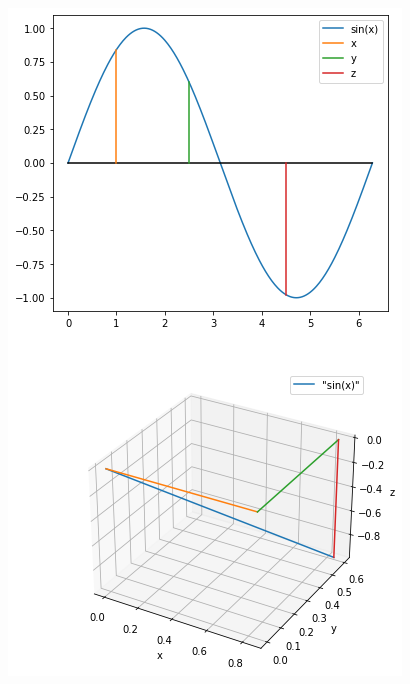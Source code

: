 \begin{frame}
\begin{columns}[t]
\begin{center}
	\includegraphics[width=\linewidth]{./gfx/sin-projection}
\end{center}
\end{columns}
%
\end{frame}


